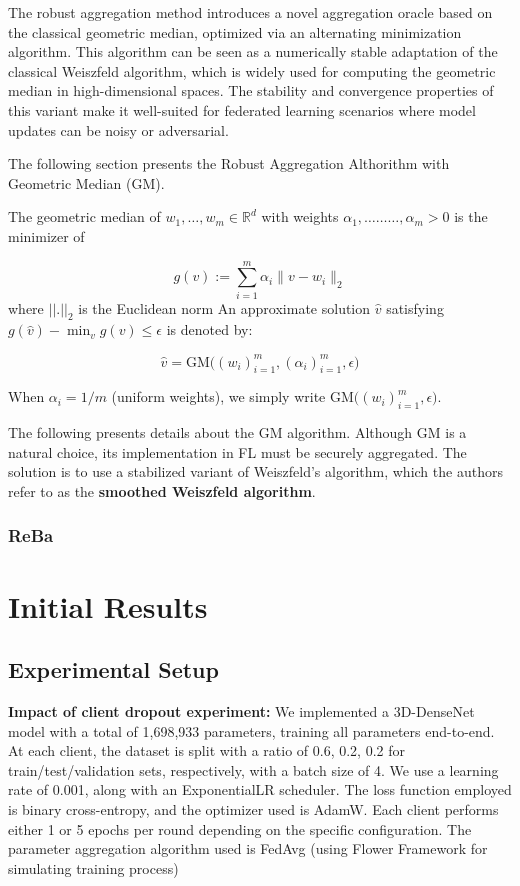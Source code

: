 \documentclass[12pt, a4paper]{article}
\begin{document}
The robust aggregation method introduces a novel aggregation oracle based on the classical geometric median, optimized via an alternating minimization algorithm. This algorithm can be seen as a numerically stable adaptation of the classical Weiszfeld algorithm, which is widely used for computing the geometric median in high-dimensional spaces. The stability and convergence properties of this variant make it well-suited for federated learning scenarios where model updates can be noisy or adversarial.

The following section presents the Robust Aggregation Althorithm with Geometric Median (GM).

The geometric median of $w_1, \dots, w_m \in \mathbb{R}^d$ with weights $\alpha_1, \dots \dots \dots, \alpha_m > 0$ is the minimizer of

\begin{equation}
    g(v) := \sum_{i=1}^m \alpha_i \|v - w_i\|_2
\end{equation}
where $||.||_2$ is the Euclidean norm
An approximate solution $\hat{v}$ satisfying $g(\hat{v}) - \min_v g(v) \leq \epsilon$ is denoted by:

\begin{equation}
\hat{v} = \text{GM}\big((w_i)_{i=1}^m, (\alpha_i)_{i=1}^m, \epsilon\big)
\end{equation}

When $\alpha_i = 1/m$ (uniform weights), we simply write $\text{GM}\big((w_i)_{i=1}^m, \epsilon\big)$.

The following presents details about the GM algorithm. Although GM is a natural choice, its implementation in FL must be securely aggregated. The solution is to use a stabilized variant of Weiszfeld's algorithm, which the authors refer to as the \textbf{smoothed Weiszfeld algorithm}.


\subsubsection{ReBa}

\section{Initial Results}

\subsection{Experimental Setup}

\textbf{Impact of client dropout experiment:} We implemented a 3D-DenseNet model with a total of 1,698,933 parameters, training all parameters end-to-end. At each client, the dataset is split with a ratio of 0.6, 0.2, 0.2 for train/test/validation sets, respectively, with a batch size of 4. We use a learning rate of 0.001, along with an ExponentialLR scheduler. The loss function employed is binary cross-entropy, and the optimizer used is AdamW. Each client performs either 1 or 5 epochs per round depending on the specific configuration. The parameter aggregation algorithm used is FedAvg (using Flower Framework for simulating training process) 
\end{document}

